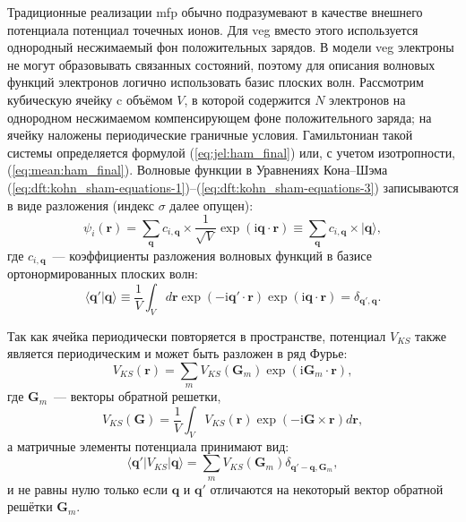 Традиционные реализации \acrshort{mfp} обычно подразумевают в качестве внешнего потенциала потенциал точечных ионов. Для \acrshort{veg} вместо этого используется однородный несжимаемый фон положительных зарядов. В модели \acrshort{veg} электроны не могут образовывать связанных состояний, поэтому для описания волновых функций электронов логично использовать базис плоских волн. Рассмотрим кубическую ячейку c объёмом $V$, в которой содержится $N$ электронов на однородном несжимаемом компенсирующем фоне положительного заряда; на ячейку наложены периодические граничные условия. Гамильтониан такой системы определяется формулой (\ref{eq:jel:ham_final}) или, с учетом изотропности, (\ref{eq:mean:ham_final}). Волновые функции в Уравнениях Кона--Шэма  (\ref{eq:dft:kohn_sham-equations-1})--(\ref{eq:dft:kohn_sham-equations-3}) записываются в виде разложения (индекс $\sigma$ далее опущен):
%
\begin{equation}
    \psi_i(\mathbf{r}) = \sum_\mathbf{q} c_{i,\mathbf{q}}\times
        \frac{1}{\sqrt{V}} \exp(\text{i} \mathbf{q}\cdot\mathbf{r})\equiv
        \sum_\mathbf{q} c_{i,\mathbf{q}}\times |\mathbf{q}\rangle,
\end{equation}
%
где $c_{i,\mathbf{q}}$~--- коэффициенты разложения волновых функций в базисе ортонормированных плоских волн:
%
\begin{equation}
    \langle\mathbf{q}'|\mathbf{q}\rangle\equiv
        \frac{1}{V}\int_V d\mathbf{r} \exp(-\text{i}\mathbf{q}'\cdot\mathbf{r}) 
        \exp(\text{i}\mathbf{q}\cdot \mathbf{r}) = \delta_{\mathbf{q}',\mathbf{q}}.
\end{equation}
%

Так как ячейка периодически повторяется в пространстве, потенциал $V_{KS}$ также является периодическим и может быть разложен в ряд Фурье:
%
\begin{equation}
    V_{KS}(\mathbf{r}) = \sum_m V_{KS}(\mathbf{G}_m)\exp(\text{i}\mathbf{G}_m\cdot\mathbf{r}),
\end{equation}
%
где $\mathbf{G}_m$~--- векторы обратной решетки, 
%
\begin{equation}
    V_{KS}(\mathbf{G}) = \frac{1}{V} \int_V V_{KS}(\mathbf{r})\exp(-\text{i}\mathbf{G}\times \mathbf{r})d\mathbf{r},
\end{equation}
%
а матричные элементы потенциала принимают вид:
%
\begin{equation}
    \langle\mathbf{q}'|V_{KS}|\mathbf{q}\rangle = \sum_m V_{KS}(\mathbf{G}_m)
        \delta_{\mathbf{q}' - \mathbf{q},\mathbf{G}_m},
\end{equation}
%
и не равны нулю только если $\mathbf{q}$ и $\mathbf{q'}$ отличаются на некоторый вектор обратной решётки $\mathbf{G}_m$.


